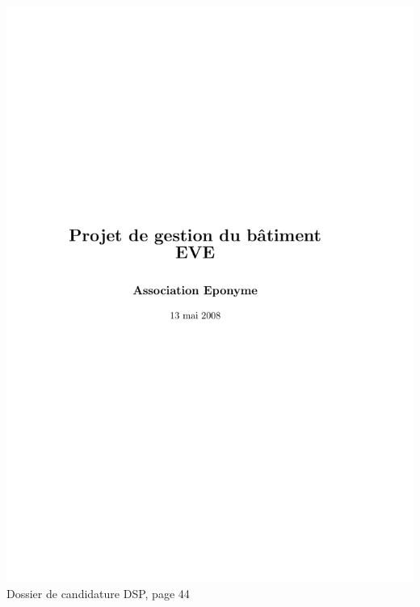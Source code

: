 \includegraphics[scale=0.85,trim=20mm 20mm 20mm 20mm,clip,page=44]{annexes/candidature_dsp.pdf} \\
Dossier de candidature DSP, page 44
\newpage

